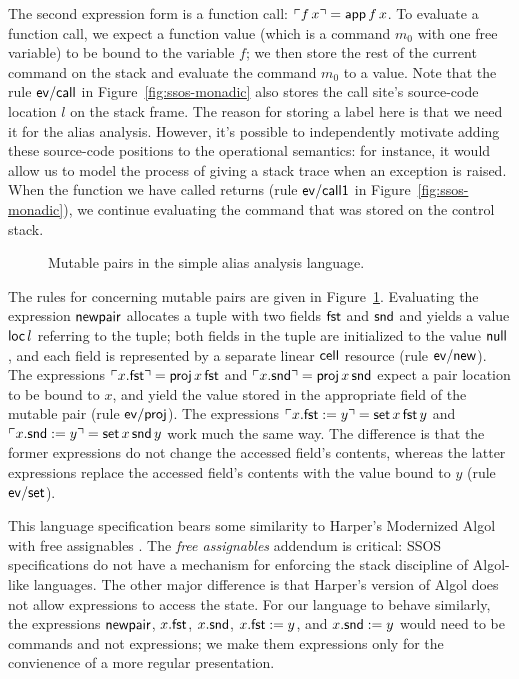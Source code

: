 The second expression form is a function call: ${\ulcorner{f\,x}\urcorner} = {\sf
  app}\,f\,x$. To evaluate a function call, we expect a function value
(which is a command $m_0$ with one free variable) to be bound to the
variable $f$; we then store the rest of the current command on the
stack and evaluate the command $m_0$ to a value. Note that the rule
${\sf ev/call}$ in Figure~\ref{fig:ssos-monadic} also stores the call
site's source-code location $l$ on the stack frame. The reason for
storing a label here is that we need it for the alias
analysis. However, it's possible to independently motivate adding
these source-code positions to the operational semantics: for instance, it
would allow us to model the process of giving a stack trace when an
exception is raised. When the function we have called returns (rule
${\sf ev/call1}$ in Figure~\ref{fig:ssos-monadic}), we continue
evaluating the command that was stored on the control stack.

\begin{figure}
\caption{Mutable pairs in the simple alias analysis language.}
\label{fig:ssos-monadic2}
\end{figure}

The rules for concerning mutable pairs are given in
Figure~\ref{fig:ssos-monadic2}. Evaluating the expression ${\sf
  newpair}$ allocates a tuple with two fields ${\sf fst}$ and ${\sf
  snd}$ and yields a value ${\sf loc}\,l$ referring to the tuple; both
fields in the tuple are initialized to the value ${\sf null}$, and
each field is represented by a separate linear ${\sf cell}$ resource
(rule ${\sf ev/new}$). The expressions ${\ulcorner{x.{\sf fst}}\urcorner} = {\sf
  proj}\,x\,{\sf fst}$ and ${\ulcorner{x.{\sf snd}}\urcorner} = {\sf proj}\,x\,{\sf
  snd}$ expect a pair location to be bound to $x$, and yield the value
stored in the appropriate field of the mutable pair (rule ${\sf
  ev/proj}$). The expressions ${\ulcorner{x.{\sf fst} := y}\urcorner} = {\sf
  set}\,x\,{\sf fst}\,y$ and ${\ulcorner{x.{\sf snd} := y}\urcorner} = {\sf
  set}\,x\,{\sf snd}\,y$ work much the same way. The difference is
that the former expressions do not change the accessed field's
contents, whereas the latter expressions replace the accessed field's
contents with the value bound to $y$ (rule ${\sf ev/set}$).

This language specification bears some similarity to Harper's
Modernized Algol with free assignables \cite[Chapter
36]{harper12practical}. The {\it free assignables} addendum is
critical: SSOS specifications do not have a mechanism for enforcing
the stack discipline of Algol-like languages. The other major
difference is that Harper's version of Algol does not allow
expressions to access the state.  For our language to behave
similarly, the expressions ${\sf newpair}$, $x.{\sf fst}$, $x.{\sf
  snd}$, $x.{\sf fst} := y$, and $x.{\sf snd} := y$ would need to be
commands and not expressions; we make them expressions only for the
convienence of a more regular presentation.


